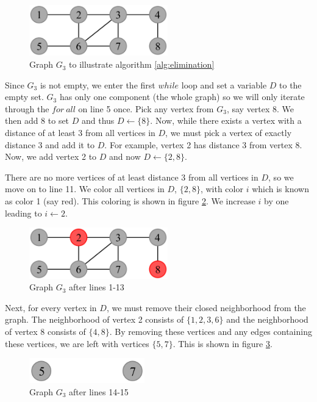 \documentclass{sig-alternate}
\begin{document}
\begin{figure}[h]
	\centering
	\includegraphics[width=6cm]{../figures/algorithm1.pdf}
	\caption{Graph $G_3$ to illustrate algorithm \ref{alg:elimination}}\label{fig:algorithm1}
\end{figure}

Since $G_3$ is not empty, we enter the first $while$ loop and set a variable $D$ to the empty set. $G_3$ has only one component (the whole graph) so we will only iterate through the $for\ all$ on line 5 once. Pick any vertex from $G_3$, say vertex 8. We then add 8 to set $D$ and thus $D \gets \{8\}$. Now, while there exists a vertex with a distance of at least 3 from all vertices in $D$, we must pick a vertex of exactly distance 3 and add it to $D$. For example, vertex 2 has distance 3 from vertex 8. Now, we add vertex 2 to $D$ and now $D \gets \{2, 8\}$.

There are no more vertices of at least distance 3 from all vertices in $D$, so we move on to line 11. We color all vertices in $D$, $\{2,8\}$, with color $i$ which is known as color 1 (say red). This coloring is shown in figure \ref{fig:algorithm1-step1}. We increase $i$ by one leading to $i \gets 2$.

\begin{figure}[h]
	\centering
	\includegraphics[width=6cm]{../figures/algorithm1-step1.pdf}
	\caption{Graph $G_3$ after lines 1-13}\label{fig:algorithm1-step1}
\end{figure}

Next, for every vertex in $D$, we must remove their closed neighborhood from the graph. The neighborhood of vertex 2 consists of $\{1,2,3,6\}$ and the neighborhood of vertex 8 consists of $\{4,8\}$. By removing these vertices and any edges containing these vertices, we are left with vertices $\{5, 7\}$. This is shown in figure \ref{fig:algorithm1-step2}.

\begin{figure}[h]
	\centering
	\includegraphics[width=5cm]{../figures/algorithm1-step2.pdf}
	\caption{Graph $G_3$ after lines 14-15}\label{fig:algorithm1-step2}
\end{figure}
\end{document}
